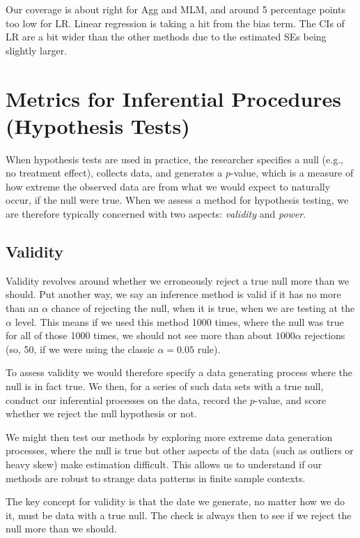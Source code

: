 \documentclass[
]{book}
\begin{document}
Our coverage is about right for Agg and MLM, and around 5 percentage points too low for LR.
Linear regression is taking a hit from the bias term.
The CIs of LR are a bit wider than the other methods due to the estimated SEs being slightly larger.

\section{Metrics for Inferential Procedures (Hypothesis Tests)}\label{assessing-inferential-procedures}

When hypothesis tests are used in practice, the researcher specifies a null (e.g., no treatment effect), collects data, and generates a \(p\)-value, which is a measure of how extreme the observed data are from what we would expect to naturally occur, if the null were true.
When we assess a method for hypothesis testing, we are therefore typically concerned with two aspects: \emph{validity} and \emph{power}.

\subsection{Validity}\label{validity}

Validity revolves around whether we erroneously reject a true null more than we should.
Put another way, we say an inference method is valid if it has no more than an \(\alpha\) chance of rejecting the null, when it is true, when we are testing at the \(\alpha\) level.
This means if we used this method 1000 times, where the null was true for all of those 1000 times, we should not see more than about \(1000 \alpha\) rejections (so, 50, if we were using the classic \(\alpha = 0.05\) rule).

To assess validity we would therefore specify a data generating process where the null is in fact true.
We then, for a series of such data sets with a true null, conduct our inferential processes on the data, record the \(p\)-value, and score whether we reject the null hypothesis or not.

We might then test our methods by exploring more extreme data generation processes, where the null is true but other aspects of the data (such as outliers or heavy skew) make estimation difficult.
This allows us to understand if our methods are robust to strange data patterns in finite sample contexts.

The key concept for validity is that the date we generate, no matter how we do it, must be data with a true null.
The check is always then to see if we reject the null more than we should.
\end{document}

